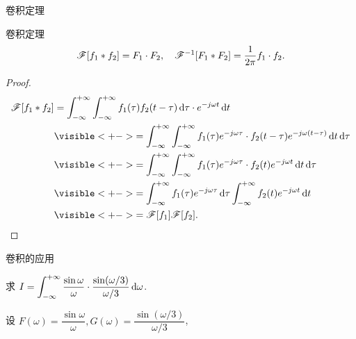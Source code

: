\begin{frame}{卷积定理\noexer}
	\onslide<+->
	\begin{block}{卷积定理}
	\[\mathscr{F}[f_1\ast f_2]=F_1\cdot F_2,\quad
	\mathscr{F}^{-1}[F_1\ast F_2]=\frac1{2\pi}f_1\cdot f_2.\]
	\vspace{-\baselineskip}
	\end{block}

	\onslide<+->
	\begin{proof}
		\vspace{-\baselineskip}
		\begin{align*}
			\msf[f_1\ast f_2]&=\int_{-\infty}^{+\infty}\int_{-\infty}^{+\infty}f_1(\tau)f_2(t-\tau)\diff \tau \cdot e^{-j\omega t}\diff t\\
			&\visible<+->{=\int_{-\infty}^{+\infty}\int_{-\infty}^{+\infty}f_1(\tau)e^{-j\omega \tau}\cdot f_2(t-\tau)e^{-j\omega (t-\tau)}\diff t\diff \tau}\\
			&\visible<+->{=\int_{-\infty}^{+\infty}\int_{-\infty}^{+\infty}f_1(\tau)e^{-j\omega \tau}\cdot f_2(t)e^{-j\omega t}\diff t\diff \tau}\\
			&\visible<+->{=\int_{-\infty}^{+\infty}f_1(\tau)e^{-j\omega \tau}\diff\tau\int_{-\infty}^{+\infty}f_2(t)e^{-j\omega t}\diff t}\\
			&\visible<+->{=\msf[f_1]\msf[f_2].\qedhere}
		\end{align*}
	\end{proof}
\end{frame}


\begin{frame}{卷积的应用\noexer}
	\onslide<+->
	\begin{example}
		求 $\displaystyle	I=\int_{-\infty}^{+\infty}\frac{\sin \omega}{\omega}\cdot \frac{\sin (\omega/3)}{\omega/3}\,\mathrm{d}\omega$.
	\end{example}

	\onslide<+->
	\begin{solution}
			设 $F(\omega)=\dfrac{\sin\omega}{\omega},G(\omega)=\dfrac{\sin(\omega/3)}{\omega/3}$,%
		\onslide<+->{
			\[\msf^{-1}[FG](0)=\frac1{2\pi}\int_{-\infty}^{+\infty}F(\omega)G(\omega)\diff\omega=\frac1{2\pi}I.\]
		}
	\end{solution}
\end{frame}


